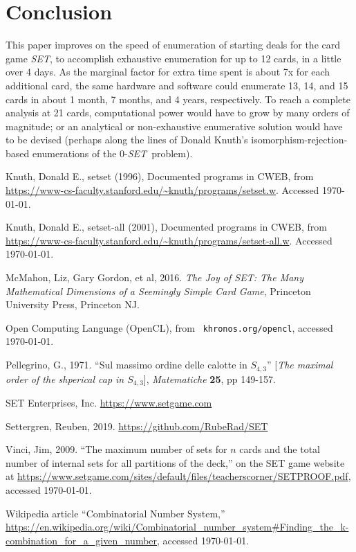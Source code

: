 \documentclass{article}
\newcommand{\SET}{{\em SET}}
\begin{document}
\section{Conclusion}
This paper improves on the speed of enumeration of starting deals for the card
game \SET, to accomplish exhaustive enumeration for up to 12 cards, in a little
over 4 days. As the marginal factor for extra time spent is about 7x for each
additional card, the same hardware and software could enumerate 13, 14, and 15
cards in about 1 month, 7 months, and 4 years, respectively. To reach a complete
analysis at 21 cards, computational power would have to grow by many orders of
magnitude; or an analytical or non-exhaustive enumerative solution would have to
be devised (perhaps along the lines of Donald Knuth's
isomorphism-rejection-based enumerations of the 0-\SET~problem).



\begin{thebibliography}{9} %


Knuth, Donald E., {\sc setset} (1996), Documented programs in
  CWEB, from
  \url{https://www-cs-faculty.stanford.edu/~knuth/programs/setset.w}. Accessed
  \today.

Knuth, Donald E., {\sc setset-all} (2001), Documented
  programs in CWEB, from
  \url{https://www-cs-faculty.stanford.edu/~knuth/programs/setset-all.w}. Accessed
  \today.

 McMahon, Liz, Gary Gordon, et al, 2016. {\em The Joy of SET: The
  Many Mathematical Dimensions of a Seemingly Simple Card Game}, Princeton
  University Press, Princeton NJ.

 Open Computing Language (OpenCL), from {\tt
  khronos.org/opencl}, accessed \today.

Pellegrino, G., 1971. ``Sul massimo ordine delle calotte in
  $S_{4,3}$'' [{\em The maximal order of the shperical cap in $S_{4,3}$}], {\em
  Matematiche} {\bf 25}, pp 149-157.

 SET Enterprises, Inc. \url{https://www.setgame.com}

Settergren, Reuben, 2019. \url{https://github.com/RubeRad/SET}
  
Vinci, Jim, 2009. ``The maximum number of sets for $n$ cards and
  the total number of internal sets for all partitions of the deck,'' on the
  SET game website at
  \url{https://www.setgame.com/sites/default/files/teacherscorner/SETPROOF.pdf},
  accessed \today.

 Wikipedia article ``Combinatorial Number System,'' \url{https://en.wikipedia.org/wiki/Combinatorial_number_system#Finding_the_k-combination_for_a_given_number},
  accessed \today.

\end{thebibliography}
 
\end{document}
